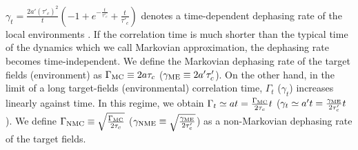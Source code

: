 \documentclass[prl,twocolumn,superscriptaddress]{revtex4}
\begin{document}
$\gamma _t=\frac{2a'(\tau '_c)^2}{t}(-1+e^{-\frac{t}{\tau '_c}}+\frac{t}{\tau'
_c})$
denotes a time-dependent dephasing rate of the local environments \cite{palma1996quantum,breuer2002theory,chin2012quantum}. If the correlation time is much shorter than the typical time
of the dynamics which we call Markovian approximation,
 the dephasing
rate becomes time-independent. We define the Markovian dephasing rate
 of the target fields (environment)
as $\Gamma _{\rm{MC}}\equiv 2a\tau _c$ ($\gamma _{\rm{ME}}\equiv 2a'\tau '_c$). On the
other hand, in the limit of a long
target-fields (environmental)
correlation time, 
$\Gamma _t$ ($\gamma _t$) increases linearly against time.
 In this regime, we obtain $\Gamma _t\simeq at=\frac{\Gamma _{\rm{MC}}}{2\tau
_c}t$ ($\gamma _t\simeq a't=\frac{\gamma _{\rm{ME}}}{2\tau
'_c}t$). We define $\Gamma _{\rm{NMC}} \equiv
\sqrt{\frac{\Gamma _{\rm{MC}}}{2\tau_c}}$
($\gamma _{\rm{NME}}\equiv \sqrt{\frac{\gamma _{\rm{ME}}}{2\tau'_c}}$)
as a non-Markovian dephasing rate of the target fields.
\end{document}
